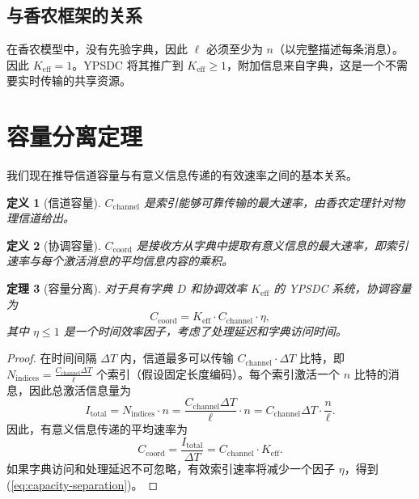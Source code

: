 \documentclass[12pt,a4paper]{article}
\newtheorem{theorem}{定理}[section]
\newtheorem{definition}[theorem]{定义}
\theoremstyle{remark}
\newcommand{\Keff}{K_{\mathrm{eff}}}
\begin{document}
	\subsection{与香农框架的关系}
	
	在香农模型中，没有先验字典，因此 $\ell$ 必须至少为 $n$（以完整描述每条消息）。因此 $\Keff = 1$。YPSDC 将其推广到 $\Keff \ge 1$，附加信息来自字典，这是一个不需要实时传输的共享资源。
	
	\section{容量分离定理}
	\label{sec:separation}
	
	我们现在推导信道容量与有意义信息传递的有效速率之间的基本关系。
	
	\begin{definition}[信道容量]
		$C_{\text{channel}}$ 是索引能够可靠传输的最大速率，由香农定理针对物理信道给出。
	\end{definition}
	
	\begin{definition}[协调容量]
		$C_{\text{coord}}$ 是接收方从字典中提取有意义信息的最大速率，即索引速率与每个激活消息的平均信息内容的乘积。
	\end{definition}
	
	\begin{theorem}[容量分离]
		对于具有字典 $D$ 和协调效率 $\Keff$ 的 YPSDC 系统，协调容量为
		\begin{equation}
			C_{\text{coord}} = \Keff \cdot C_{\text{channel}} \cdot \eta,
			\label{eq:capacity-separation}
		\end{equation}
		其中 $\eta \le 1$ 是一个时间效率因子，考虑了处理延迟和字典访问时间。
	\end{theorem}
	
	\begin{proof}
		在时间间隔 $\Delta T$ 内，信道最多可以传输 $C_{\text{channel}} \cdot \Delta T$ 比特，即 $N_{\text{indices}} = \frac{C_{\text{channel}} \Delta T}{\ell}$ 个索引（假设固定长度编码）。每个索引激活一个 $n$ 比特的消息，因此总激活信息量为
		\[
		I_{\text{total}} = N_{\text{indices}} \cdot n = \frac{C_{\text{channel}} \Delta T}{\ell} \cdot n = C_{\text{channel}} \Delta T \cdot \frac{n}{\ell}.
		\]
		因此，有意义信息传递的平均速率为
		\[
		C_{\text{coord}} = \frac{I_{\text{total}}}{\Delta T} = C_{\text{channel}} \cdot \Keff.
		\]
		如果字典访问和处理延迟不可忽略，有效索引速率将减少一个因子 $\eta$，得到 (\ref{eq:capacity-separation})。
	\end{proof}
	
\end{document}
